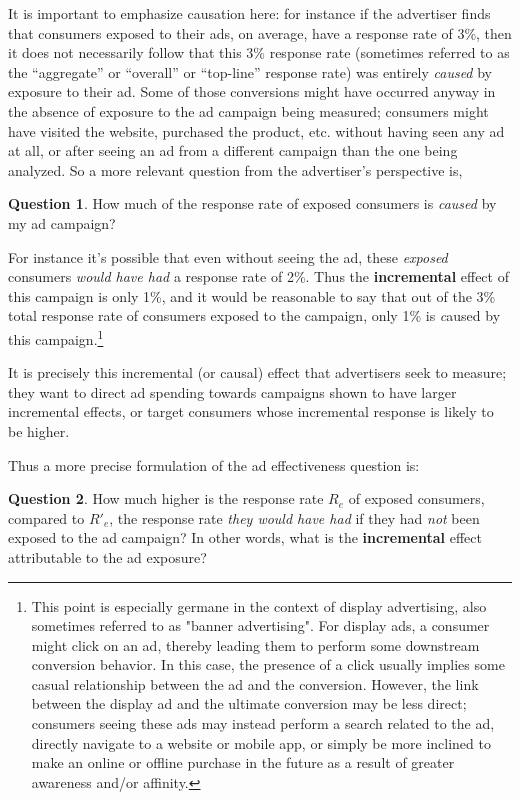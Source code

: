 \documentclass[11pt,a4paper]{article}
\theoremstyle{definition}
\theoremstyle{remark}
\theoremstyle{definition}
\theoremstyle{definition}
\theoremstyle{definition}
\newtheorem{question}{Question}[section]
\theoremstyle{definition}
\theoremstyle{definition}
\theoremstyle{definition}
\begin{document}
It is important to emphasize causation here: for instance if the advertiser finds that consumers exposed to their ads, on average, have a response rate of 3\%, then it does not necessarily follow that this 3\% response rate (sometimes referred to as the “aggregate” or “overall” or “top-line” response rate) was entirely {\em caused} by exposure to their ad. Some of those conversions might have occurred anyway in the absence of exposure to the ad campaign being measured; consumers might have visited the website, purchased the product, etc. without having seen any ad at all, or after seeing an ad from a different campaign than the one being analyzed. So a more relevant question from the advertiser's perspective is, 

\begin{question}
	How much of the response rate of exposed consumers is  \textit{caused} by my ad campaign? 
\end{question}


For instance it's possible that even without seeing the ad, these {\em exposed} consumers {\em would have had} a response rate of 2\%. Thus the {\bf incremental} effect of this campaign is only 1\%, and it would be reasonable to say that out of the 3\% total response rate of consumers exposed to the campaign, only 1\% is {\emph caused} by this campaign.\footnote{This point is especially germane in the context of display advertising, also sometimes referred to as "banner advertising". For display ads, a consumer might click on an ad, thereby leading them to perform some downstream conversion behavior. In this case, the presence of a click usually implies some casual relationship between the ad and the conversion. However, the link between the display ad and the ultimate conversion may be less direct; consumers seeing these ads may instead perform a search related to the ad, directly navigate to a website or mobile app, or simply be more inclined to make an online or offline purchase in the future as a result of greater awareness and/or affinity.}

It is precisely this incremental (or causal) effect that advertisers seek to measure; they want to direct ad spending towards  campaigns shown to have larger incremental effects, or target consumers whose incremental response is likely to be higher.

Thus a more precise formulation of the ad effectiveness question is:
\begin{question} \label{q-incr}
	How much higher is the response rate $R_e$ of exposed consumers, compared to $R'_e$, the response rate {\em they would have had} if they had {\em not} been exposed to the ad campaign? In other words, what is the \textbf{incremental} effect attributable to the ad exposure?
\end{question}
\end{document}
